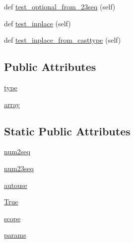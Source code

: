 \begin{DoxyCompactItemize}
\item 
def \hyperlink{classnumpy_1_1f2py_1_1tests_1_1test__array__from__pyobj_1_1TestSharedMemory_a862691e8905bcec027f8f0cf38183a2b}{test\+\_\+optional\+\_\+from\+\_\+23seq} (self)
\item 
def \hyperlink{classnumpy_1_1f2py_1_1tests_1_1test__array__from__pyobj_1_1TestSharedMemory_a818810171120b230c931a326e2c3a285}{test\+\_\+inplace} (self)
\item 
def \hyperlink{classnumpy_1_1f2py_1_1tests_1_1test__array__from__pyobj_1_1TestSharedMemory_a7f6cd00972e558bef28b2162773d98cc}{test\+\_\+inplace\+\_\+from\+\_\+casttype} (self)
\end{DoxyCompactItemize}
\subsection*{Public Attributes}
\begin{DoxyCompactItemize}
\item 
\hyperlink{classnumpy_1_1f2py_1_1tests_1_1test__array__from__pyobj_1_1TestSharedMemory_af16cd714eb6d87cceabcc7360ad975c7}{type}
\item 
\hyperlink{classnumpy_1_1f2py_1_1tests_1_1test__array__from__pyobj_1_1TestSharedMemory_a5c956596073b50a537c22768b861be62}{array}
\end{DoxyCompactItemize}
\subsection*{Static Public Attributes}
\begin{DoxyCompactItemize}
\item 
\hyperlink{classnumpy_1_1f2py_1_1tests_1_1test__array__from__pyobj_1_1TestSharedMemory_a6e8364b336061360d7b72f420bd47957}{num2seq}
\item 
\hyperlink{classnumpy_1_1f2py_1_1tests_1_1test__array__from__pyobj_1_1TestSharedMemory_a1bcfdf7a8fe37f169555031752b9ae5e}{num23seq}
\item 
\hyperlink{classnumpy_1_1f2py_1_1tests_1_1test__array__from__pyobj_1_1TestSharedMemory_aa8d46c2ba5899bb9eef2097121f27694}{autouse}
\item 
\hyperlink{classnumpy_1_1f2py_1_1tests_1_1test__array__from__pyobj_1_1TestSharedMemory_ade8daf873c64a9684448e380119c4d51}{True}
\item 
\hyperlink{classnumpy_1_1f2py_1_1tests_1_1test__array__from__pyobj_1_1TestSharedMemory_a44d4772b841ff67a5f331a751d4d804f}{scope}
\item 
\hyperlink{classnumpy_1_1f2py_1_1tests_1_1test__array__from__pyobj_1_1TestSharedMemory_a4248482385405334fc07d7e7d8cda0af}{params}
\end{DoxyCompactItemize}


